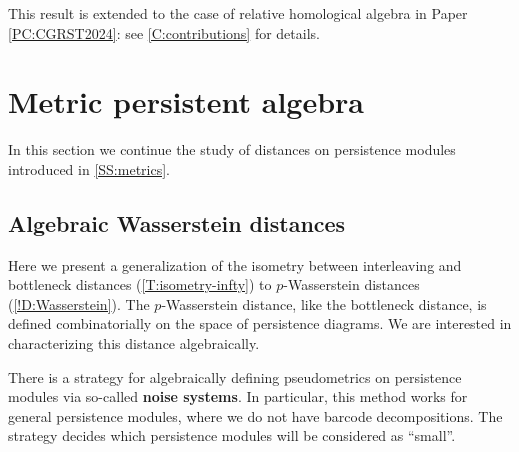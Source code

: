 This result is extended to the case of relative homological algebra in Paper \ref{PC:CGRST2024}: see \cref{C:contributions} for details.


\section{Metric persistent algebra}

In this section we continue the study of distances on persistence modules introduced in \cref{SS:metrics}.

\subsection{Algebraic Wasserstein distances}
\label{SS:algebraic-wasserstein}

Here we present a generalization of the isometry between interleaving and bottleneck distances (\cref{T:isometry-infty}) to $p$-Wasserstein distances (\cref{!D:Wasserstein}). The $p$-Wasserstein distance, like the bottleneck distance, is defined combinatorially on the space of persistence diagrams. We are interested in characterizing this distance algebraically.

There is a strategy for algebraically defining pseudometrics on persistence modules via so-called \textbf{noise systems}. In particular, this method works for general persistence modules, where we do not have barcode decompositions. The strategy decides which persistence modules will be considered as ``small''.

